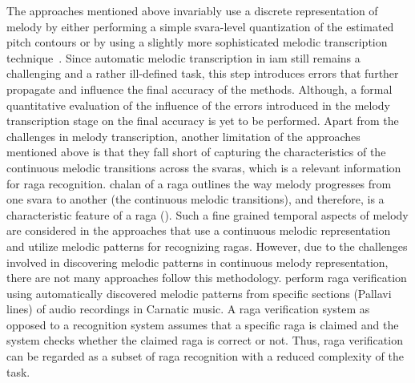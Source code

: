 The approaches mentioned above invariably use a discrete representation of melody by either performing a simple \gls{svara}-level quantization of the estimated pitch contours or by using a slightly more sophisticated melodic transcription technique~\cite{pandey2003tansen}. Since automatic melodic transcription in \gls{iam} still remains a challenging and a rather ill-defined task, this step introduces errors that further propagate and influence the final accuracy of the methods. Although, a formal quantitative evaluation of the influence of the errors introduced in the melody transcription stage on the final accuracy is yet to be performed. Apart from the challenges in melody transcription, another limitation of the approaches mentioned above is that they fall short of capturing the characteristics  of  the continuous melodic transitions across the \glspl{svara}, which is a relevant information for \gls{raga} recognition. \Gls{chalan} of a \gls{raga} outlines the way melody progresses from one \gls{svara} to another (the continuous melodic transitions), and therefore, is a characteristic feature of a \gls{raga} (). Such a fine grained temporal aspects of melody are considered in the approaches that use a continuous melodic representation and utilize melodic patterns for recognizing \glspl{raga}. However, due to the challenges involved in discovering melodic patterns in continuous melody representation, there are not many approaches follow this methodology. \cite{shrey_ISMIR_2015} perform \gls{raga} verification using automatically discovered melodic patterns from specific sections (Pallavi lines) of audio recordings in Carnatic music. A \gls{raga} verification system as opposed to a recognition system assumes that a specific \gls{raga} is claimed and the system checks whether the claimed \gls{raga} is correct or not. Thus, \gls{raga} verification can be regarded as a subset of \gls{raga} recognition with a reduced complexity of the task. 


